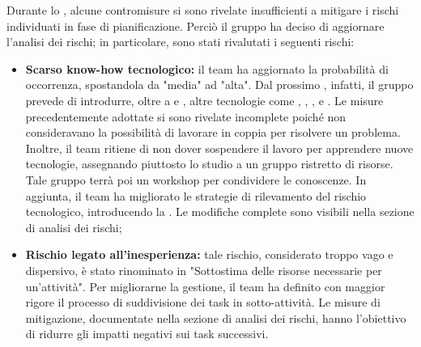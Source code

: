 \vspace{0.5\baselineskip}
\par Durante lo , alcune contromisure si sono rivelate insufficienti a mitigare i rischi individuati in fase di pianificazione. Perciò il gruppo ha deciso di aggiornare l'analisi dei rischi; in particolare, sono stati rivalutati i seguenti rischi:
\begin{itemize}
  \item \textbf{Scarso know-how tecnologico:} il team ha aggiornato la probabilità di occorrenza, spostandola da "media" ad "alta". Dal prossimo , infatti, il gruppo prevede di introdurre, oltre a  e , altre tecnologie come , , ,  e . Le misure precedentemente adottate si sono rivelate incomplete poiché non consideravano la possibilità di lavorare in coppia per risolvere un problema. Inoltre, il team ritiene di non dover sospendere il lavoro per apprendere nuove tecnologie, assegnando piuttosto lo studio a un gruppo ristretto di risorse. Tale gruppo terrà poi un workshop per condividere le conoscenze. In aggiunta, il team ha migliorato le strategie di rilevamento del rischio tecnologico, introducendo la . Le modifiche complete sono visibili nella sezione di analisi dei rischi;
  \item \textbf{Rischio legato all'inesperienza:} tale rischio, considerato troppo vago e dispersivo, è stato rinominato in "Sottostima delle risorse necessarie per un'attività". Per migliorarne la gestione, il team ha definito con maggior rigore il processo di suddivisione dei task in sotto-attività. Le misure di mitigazione, documentate nella sezione di analisi dei rischi, hanno l'obiettivo di ridurre gli impatti negativi sui task successivi.
\end{itemize}



